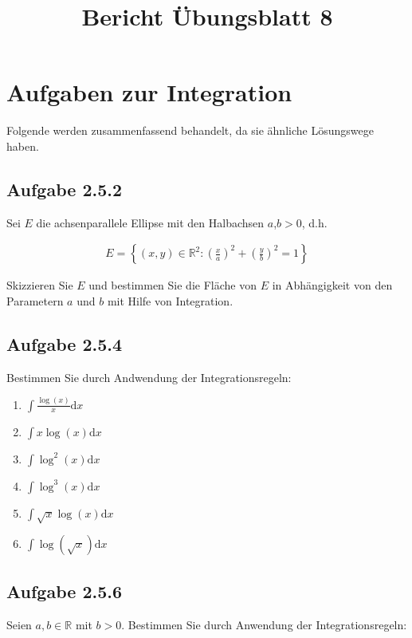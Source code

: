 \documentclass[a4paper]{article}
\title{Bericht Übungsblatt 8}
\date{}
\author{}
\newcommand*{\R}{\mathbb R}
\begin{document}
\maketitle

\section{Aufgaben zur Integration}

Folgende werden zusammenfassend behandelt, da sie ähnliche Lösungswege haben.

\subsection{Aufgabe 2.5.2}

Sei $E$ die achsenparallele Ellipse mit den Halbachsen $a$,$b>0$, d.h.

\begin{align}
  E=\left\{(x,y)\in\R^2: \left(\frac xa\right)^2+\left(\frac yb\right)^2=1\right\}
\end{align}

Skizzieren Sie $E$ und bestimmen Sie die Fläche von $E$ in Abhängigkeit von den Parametern $a$ und $b$ mit Hilfe von Integration.

\subsection{Aufgabe 2.5.4}

Bestimmen Sie durch Andwendung der Integrationsregeln:

\begin{enumerate}
  \item $\int \frac{\log(x)}{x} \mathrm dx$
  \item $\int x\log(x) \mathrm dx$
  \item $\int \log^2(x) \mathrm dx$
  \item $\int \log^3(x) \mathrm dx$
  \item $\int \sqrt{x} \log(x) \mathrm dx$
  \item $\int \log\left(\sqrt x\right) \mathrm dx$
\end{enumerate}

\subsection{Aufgabe 2.5.6}

Seien $a,b\in\R$ mit $b>0$. Bestimmen Sie durch Anwendung der Integrationsregeln:
\end{document}
